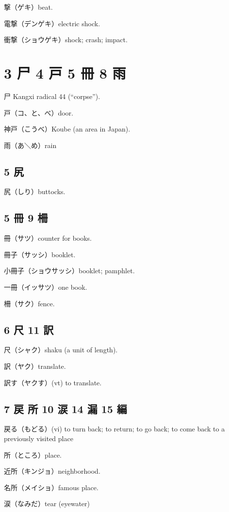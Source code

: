 撃（ゲキ）beat.

電撃（デンゲキ）electric shock.

衝撃（ショウゲキ）shock; crash; impact.

\section{3 尸 4 戸 5 冊 8 雨}

尸 Kangxi radical 44 (``corpse'').

戸（コ、と、べ）door.

神戸（こうべ）Koube (an area in Japan).

雨（あ＼め）rain

\subsection{5 尻}

尻（しり）buttocks.

\subsection{5 冊 9 柵}

冊（サツ）counter for books.

冊子（サッシ）booklet.

小冊子（ショウサッシ）booklet; pamphlet.

一冊（イッサツ）one book.

柵（サク）fence.

\subsection{6 尺 11 訳}

尺（シャク）shaku (a unit of length).

訳（ヤク）translate.

訳す（ヤクす）(vt) to translate.

\subsection{7 戻 所 10 涙 14 漏 15 編}

戻る（もどる）(vi) to turn back; to return; to go back;
to come back to a previously visited place

所（ところ）place.

近所（キンジョ）neighborhood.

名所（メイショ）famous place.

涙（なみだ）tear (eyewater)

